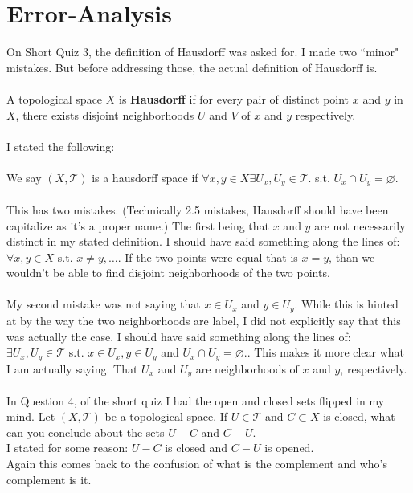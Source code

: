 \documentclass[10pt]{article}
\newcommand{\TT}{\mathcal{T}}
\begin{document}
\section{Error-Analysis}
On Short Quiz 3, the definition of Hausdorff was asked for. I made two ``minor" mistakes. But before addressing those, the actual definition of Hausdorff is.\\
\\ 
A topological space $ X $ is \textbf{Hausdorff} if for every pair of distinct point $ x $ and $ y $ in $ X $, there exists disjoint neighborhoods $ U $ and $ V $ of $ x $ and $ y $ respectively. \\
\\
I stated the following:\\
\\
We say $ (X,\TT) $ is a hausdorff space if $ \forall x,y\in X \exists U_x, U_y 
\in \TT $.  s.t. $U_x\cap U_y = \varnothing$.\\
\\
This has two mistakes. (Technically 2.5 mistakes, Hausdorff should have been capitalize as it's a proper name.) The first being that $ x $ and $ y $ are not necessarily distinct in my stated definition. I should have said something along the lines of: $ \forall x,y \in X $ s.t. $ x\neq y,\ldots $. If the two points were equal that is $ x=y $, than we wouldn't be able to find disjoint neighborhoods of the two points.\\
\\
My second mistake was not saying that $ x\in U_x $ and $ y\in U_y $. While this is hinted at by the way the two neighborhoods are label, I did not explicitly say that this was actually the case. I should have said something along the lines of: $ \exists U_x, U_y \in \TT $ s.t. $ x\in U_x, y\in U_y $ and $ U_x\cap U_y = \varnothing. $. This makes it more clear what I am actually saying. That $ U_x $ and $ U_y $ are neighborhoods of $ x $ and $ y $, respectively.\\
\\
In Question 4, of the short quiz I had the open and closed sets flipped in my mind. Let $ (X,\TT) $ be a topological space. If $ U\in\TT $ and $ C\subset X $ is closed, what can you conclude about the sets $ U-C $ and $ C-U $.\\
I stated for some reason: $ U-C $ is closed and $ C-U $ is opened. \\
Again this comes back to the confusion of what is the complement and who's complement is it. \\
\end{document}
